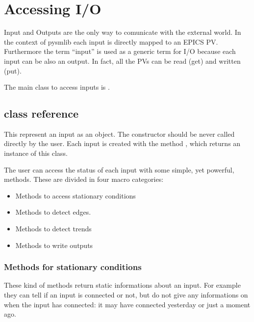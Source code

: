 \documentclass[letterpaper,10pt,english]{sphinxmanual}
\begin{document}
\section{Accessing I/O}
\label{\detokenize{io:accessing-i-o}}\label{\detokenize{io:accessing-io}}\label{\detokenize{io::doc}}
Input and Outputs are the only way to comunicate with the external world. In the
context of pysmlib each input is directly mapped to an EPICS PV. Furthermore the
term “input” is used as a generic term for I/O because each input can be also an
output. In fact, all the PVs can be read (get) and written (put).

The main class to access inputs is {\hyperref[\detokenize{io:fsmIO}]{}}.


\subsection{ class reference}
\label{\detokenize{io:fsmio-class-reference}}

\begin{fulllineitems}
\label{\detokenize{io:fsmIO}}
This represent an input as an object. The constructor should be never called
directly by the user. Each input is created with the method
{\hyperref[\detokenize{fsm:connect}]{}}, which returns an instance of this class.

\end{fulllineitems}


The user can access the status of each input with some simple, yet powerful,
methods. These are divided in four macro categories:
\begin{itemize}
\item {} 
Methods to access stationary conditions

\item {} 
Methods to detect edges.

\item {} 
Methods to detect trends

\item {} 
Methods to write outputs

\end{itemize}


\subsubsection{Methods for stationary conditions}
\label{\detokenize{io:methods-for-stationary-conditions}}\label{\detokenize{io:io-status}}
These kind of methods return static informations about an input. For example
they can tell if an input is connected or not, but do not give any informations
on when the input has connected: it may have connected yesterday or just a
moment ago.
\end{document}
